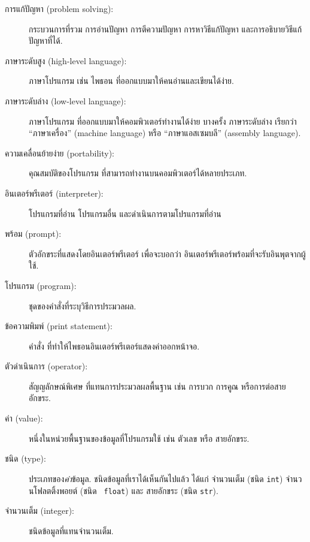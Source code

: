 \begin{description}

\item[การแก้ปัญหา (problem solving):] 
กระบวนการที่รวม การอ่านปัญหา การตีความปัญหา การหาวิธีแก้ปัญหา และการอธิบายวิธีแก้ปัญหาที่ได้.

\item[ภาษาระดับสูง (high-level language):]  
ภาษาโปรแกรม เช่น ไพธอน ที่ออกแบบมาให้คนอ่านและเขียนได้ง่าย.

\item[ภาษาระดับล่าง (low-level language):]  
ภาษาโปรแกรม
ที่ออกแบบมาให้คอมพิวเตอร์ทำงานได้ง่าย
บางครั้ง ภาษาระดับล่าง เรียกว่า ``ภาษาเครื่อง'' (machine language) หรือ
``ภาษาแอสเซมบลี'' (assembly language).

\item[ความเคลื่อนย้ายง่าย (portability):]  
คุณสมบัติของโปรแกรม ที่สามารถทำงานบนคอมพิวเตอร์ได้หลายประเภท.

\item[อินเตอร์พรีเตอร์  (interpreter):]  
โปรแกรมที่อ่าน โปรแกรมอื่น และดำเนินการตามโปรแกรมที่อ่าน

\item[พร้อม (prompt):] 
ตัวอักขระที่แสดงโดยอินเตอร์พรีเตอร์ 
เพื่อจะบอกว่า อินเตอร์พรีเตอร์พร้อมที่จะรับอินพุตจากผู้ใช้.

\item[โปรแกรม (program):] 
ชุดของคำสั่งที่ระบุวิธีการประมวลผล.

\item[ข้อความพิมพ์ (print statement):]  
คำสั่ง ที่ทำให้ไพธอนอินเตอร์พรีเตอร์แสดงค่าออกหน้าจอ.

\item[ตัวดำเนินการ (operator):]  
สัญญลักษณ์พิเศษ ที่แทนการประมวลผลพื้นฐาน เช่น
การบวก การคูณ หรือการต่อสายอักขระ.

\item[ค่า (value):]  
หนึ่งในหน่วยพื้นฐานของข้อมูลที่โปรแกรมใช้ เช่น ตัวเลข หรือ สายอักขระ.

\item[ชนิด (type):] ประเภทของ\textit{ค่า}ข้อมูล.  
ชนิดข้อมูลที่เราได้เห็นกันไปแล้ว ได้แก่ จำนวนเต็ม (ชนิด \texttt{int})
จำนวนโฟลตติ้งพอยต์ (ชนิด \texttt{
float})
และ สายอักขระ (ชนิด \texttt{str}).

\item[จำนวนเต็ม (integer):] ชนิดข้อมูลที่แทนจำนวนเต็ม.


\end{description}
